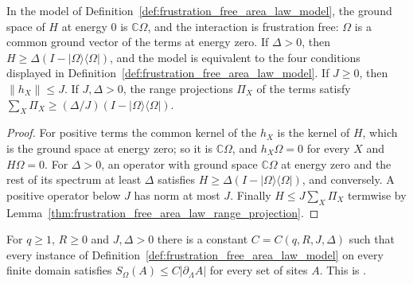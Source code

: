 \begin{lemma}
    \label{thm:frustration_free_area_law_model_gapped}
    \leanok
    In the model of Definition~\ref{def:frustration_free_area_law_model}, the
    ground space of $H$ at energy $0$ is $\mathbb C\Omega$, and the
    interaction is frustration free: $\Omega$ is a common ground vector of
    the terms at energy zero. If $\Delta>0$, then
    $H\ge\Delta(I-|\Omega\rangle\langle\Omega|)$, and the model is equivalent
    to the four conditions displayed in
    Definition~\ref{def:frustration_free_area_law_model}. If $J\ge0$, then
    $\|h_X\|\le J$. If $J,\Delta>0$, the range projections $\Pi_X$ of the terms
    satisfy $\sum_X\Pi_X\ge(\Delta/J)(I-|\Omega\rangle\langle\Omega|)$.
\end{lemma}

\begin{proof}\leanok
    For positive terms the common kernel of the $h_X$ is the kernel of $H$,
    which is the ground space at energy zero; so it is $\mathbb C\Omega$, and
    $h_X\Omega=0$ for every $X$ and $H\Omega=0$. For $\Delta>0$, an operator with ground space
    $\mathbb C\Omega$ at energy zero and the rest of its spectrum at least
    $\Delta$ satisfies $H\ge\Delta(I-|\Omega\rangle\langle\Omega|)$, and
    conversely. A positive operator below $J$ has norm at most $J$. Finally
    $H\le J\sum_X\Pi_X$ termwise by
    Lemma~\ref{thm:frustration_free_area_law_range_projection}.
\end{proof}

\begin{theorem}
    \label{thm:frustration_free_area_law}
    \leanok
    For $q\ge1$, $R\ge0$ and $J,\Delta>0$ there is a constant
    $C=C(q,R,J,\Delta)$ such that every instance of
    Definition~\ref{def:frustration_free_area_law_model} on every finite domain satisfies
    $S_\Omega(A)\le C|\partial_\Lambda A|$ for every set of sites $A$. This is
    \cite[eq.~(goal)]{TNLean2026FrustrationFreeNote}.
\end{theorem}

